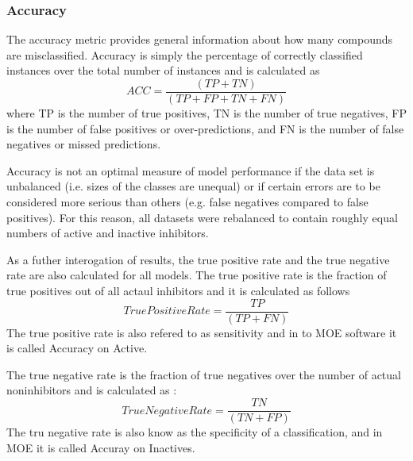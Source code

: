 \subsubsection{Accuracy}

The accuracy metric provides general information about how many compounds are misclassified. Accuracy is simply the percentage of correctly classified instances over the total number of instances and is calculated as
$$ ACC =\frac{(TP + TN)}{(TP + FP + TN + FN)} $$
where TP is the number of true positives, TN is the number of true negatives, FP is the number of false positives or over-predictions, and FN is the number of false negatives or missed predictions.

Accuracy is not an optimal measure of model performance if the data set is unbalanced (i.e. sizes of the classes are unequal) or if certain errors are to be considered more serious than others (e.g. false negatives compared to false positives).\cite{Lapins2013} For this reason, all datasets were rebalanced to contain roughly equal numbers of active and inactive inhibitors.

As a futher interogation of results, the true positive rate and the true negative rate are also calculated for all models. The true positive rate is the fraction of true positives out of all actaul inhibitors and it is calculated as follows 
$$ True Positive Rate = \frac{TP}{(TP + FN)} $$
The true positive rate is also refered to as sensitivity and in to MOE software it is called Accuracy on Active.

The true negative rate is the fraction of true negatives over the number of actual noninhibitors and is calculated as :
$$ True Negative Rate =\frac{ TN }{(TN + FP)} $$
The tru negative rate is also know as the specificity of a classification, and in MOE it is called Accuray on Inactives.




